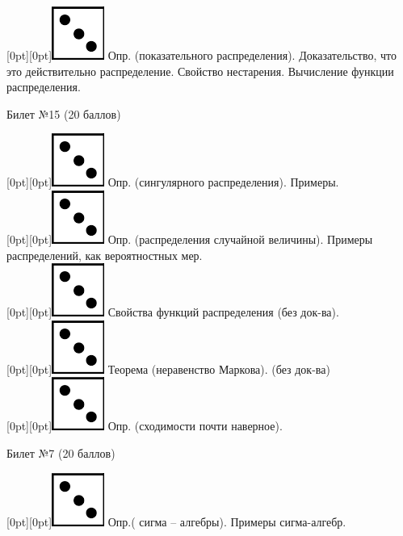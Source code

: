 \documentclass[10pt]{article}
\begin{document}
\raisebox{-1pt}[0pt][0pt]{\includegraphics[width=0.02\linewidth]{3.png}}  Опр. (показательного распределения). Доказательство, что это действительно распределение. Свойство нестарения. Вычисление функции распределения.  \\  

\begin{center} {\Large Билет №15 (20 баллов)} \end{center}

\raisebox{-1pt}[0pt][0pt]{\includegraphics[width=0.02\linewidth]{3.png}} Опр. (сингулярного распределения). Примеры. \\

\raisebox{-1pt}[0pt][0pt]{\includegraphics[width=0.02\linewidth]{3.png}} Опр. (распределения случайной величины). Примеры распределений, как вероятностных мер. \\

\raisebox{-1pt}[0pt][0pt]{\includegraphics[width=0.02\linewidth]{3.png}} Свойства функций распределения (без док-ва). \\

\raisebox{-1pt}[0pt][0pt]{\includegraphics[width=0.02\linewidth]{3.png}} Теорема (неравенство Маркова). (без док-ва) \\

\raisebox{-1pt}[0pt][0pt]{\includegraphics[width=0.02\linewidth]{3.png}} Опр. (сходимости почти наверное). \\

\begin{center} {\Large Билет №7 (20 баллов)} \end{center}

\raisebox{-1pt}[0pt][0pt]{\includegraphics[width=0.02\linewidth]{3.png}} Опр.( сигма – алгебры). Примеры сигма-алгебр. \\
\end{document}
